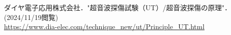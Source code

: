 \begin{thebibliography}{99}
     ダイヤ電子応用株式会社．"超音波探傷試験（UT）/超音波探傷の原理"．(2024/11/19閲覧)\\
    \url{https://www.dia-elec.com/technique_new/ut/Principle_UT.html}
\end{thebibliography}
